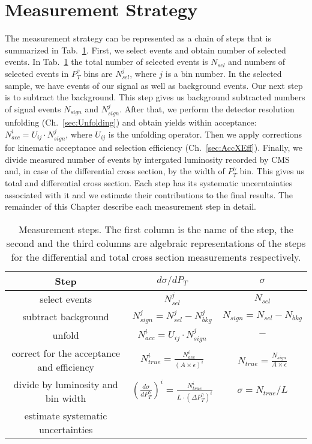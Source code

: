 \section{Measurement Strategy}
\label{sec:AN_WgMeasStrategy}

The measurement strategy can be represented as a chain of steps that is summarized in Tab.~\ref{tab:analysisOutline}. First, we select events and obtain number of selected events. In Tab.~\ref{tab:analysisOutline} the total number of selected events is $N_{sel}$ and numbers of selected events in $P_T^{\gamma}$ bins are $N_{sel}^j$, where $j$ is a bin number. In the selected sample, we have events of our signal as well as background events. Our next step is to subtract the background. This step gives us background subtracted numbers of signal events $N_{sign}$ and $N_{sign}^j$. After that, we perform the detector resolution unfolding (Ch.~\ref{sec:Unfolding}) and obtain yields within acceptance: $N_{acc}^i = U_{ij} \cdot N_{sign}^j$, where $U_{ij}$ is the unfolding operator. Then we apply corrections for kinematic acceptance and selection efficiency (Ch.~\ref{sec:AccXEff}). Finally, we divide measured number of events by intergated luminosity recorded by CMS and, in case of the differential cross section, by the width of $P_T^{\gamma}$ bin. This gives us total and differential cross section. Each step has its systematic uncerntainties associated with it and we estimate their contributions to the final results. The remainder of this Chapter describe each measurement step in detail.

\begin{table}[h]
  \small
  \begin{center}
  \caption{Measurement steps. The first column is the name of the step, the second and the third columns are algebraic representations of the steps for the differential and total cross section measurements respectively. }
  \begin{tabular}{|c|c|c|}
    \hline
    Step & $d\sigma/dP_{T}$ & $\sigma$ \\ \hline
    select events & $N_{sel}^j$ &    $N_{sel}$       \\ \hline
    subtract background & $N_{sign}^j = N_{sel}^j - N_{bkg}^j$ &    $N_{sign}=N_{sel}-N_{bkg}$       \\ \hline
    unfold   & $N_{acc}^i = U_{ij} \cdot N_{sign}^j$ &    $-$       \\ \hline
    correct for the acceptance and efficiency & $N_{true}^i = \frac{N_{acc}^i}{(A \times\epsilon)^i}$ &  $N_{true}=\frac{N_{sign}}{A\times\epsilon}$       \\ \hline
    divide by luminosity and bin width & $ \left( \frac{d\sigma}{dP_{T}^\gamma} \right) ^i = \frac{N_{true}^i}{L \cdot (\Delta P_T^\gamma)^i}$  &  $\sigma = N_{true}/L$       \\ \hline
    estimate systematic uncertainties &  &         \\ \hline
  \end{tabular}
  \label{tab:analysisOutline}
  \end{center}
\end{table}


